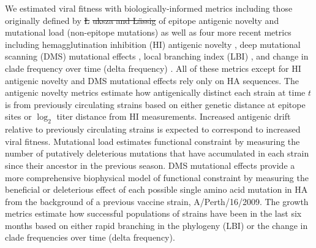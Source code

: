 \documentclass[9pt,lineno]{elife} %
\providecommand{\DIFadd}[1]{{\protect\color{blue}\uwave{#1}}} %
\providecommand{\DIFdel}[1]{{\protect\color{red}\sout{#1}}}                      %
\providecommand{\DIFaddbegin}{} %
\providecommand{\DIFaddend}{} %
\providecommand{\DIFdelbegin}{} %
\providecommand{\DIFdelend}{} %
\providecommand{\DIFaddtex}[1]{{\protect\color{blue}\uwave{#1}}} %
\providecommand{\DIFdeltex}[1]{{\protect\color{red}\sout{#1}}}                      %
\providecommand{\DIFaddbegin}{} %
\providecommand{\DIFaddend}{} %
\providecommand{\DIFdelbegin}{} %
\providecommand{\DIFdelend}{} %
\providecommand{\DIFadd}[1]{\texorpdfstring{\DIFaddtex{#1}}{#1}} %
\providecommand{\DIFdel}[1]{\texorpdfstring{\DIFdeltex{#1}}{}} %
\newcommand{\DIFscaledelfig}{0.5}
\newlength{\DIFdelgraphicswidth} %
\newlength{\DIFdelgraphicsheight} %
\newcommand{\DIFaddincludegraphics}[2][]{{\color{blue}\fbox{\DIFOincludegraphics[#1]{#2}}}} %
\newcommand{\DIFdelincludegraphics}[2][]{%
\sbox{\DIFdelgraphicsbox}{\DIFOincludegraphics[#1]{#2}}%
\settoboxwidth{\DIFdelgraphicswidth}{\DIFdelgraphicsbox} %
\settoboxtotalheight{\DIFdelgraphicsheight}{\DIFdelgraphicsbox} %
\scalebox{\DIFscaledelfig}{%
\parbox[b]{\DIFdelgraphicswidth}{\usebox{\DIFdelgraphicsbox}\\[-\baselineskip] \rule{\DIFdelgraphicswidth}{0em}}\llap{\resizebox{\DIFdelgraphicswidth}{\DIFdelgraphicsheight}{%
\setlength{\unitlength}{\DIFdelgraphicswidth}%
\begin{picture}(1,1)%
\thicklines\linethickness{2pt} %
{\color[rgb]{1,0,0}\put(0,0){\framebox(1,1){}}}%
{\color[rgb]{1,0,0}\put(0,0){\line( 1,1){1}}}%
{\color[rgb]{1,0,0}\put(0,1){\line(1,-1){1}}}%
\end{picture}%
}\hspace*{3pt}}} %
} %
\DeclareRobustCommand{\DIFaddbegin}{\DIFOaddbegin \let\includegraphics\DIFaddincludegraphics} %
\DeclareRobustCommand{\DIFaddend}{\DIFOaddend \let\includegraphics\DIFOincludegraphics} %
\DeclareRobustCommand{\DIFdelbegin}{\DIFOdelbegin \let\includegraphics\DIFdelincludegraphics} %
\DeclareRobustCommand{\DIFdelend}{\DIFOaddend \let\includegraphics\DIFOincludegraphics} %
\begin{document}
\DIFaddend We estimated viral fitness with biologically-informed metrics including those originally defined by \DIFdelbegin %
\DIFdel{\L}%
\DIFdel{uksza and L\"assig }\DIFdelend \cite{Luksza:2014hj} of epitope antigenic novelty and mutational load (non-epitope mutations) as well as four more recent metrics including hemagglutination inhibition (HI) antigenic novelty \DIFdelbegin %
\DIFdelend \DIFaddbegin \citep{Neher:2016hy}\DIFaddend , deep mutational scanning (DMS) mutational effects \DIFdelbegin %
\DIFdelend \DIFaddbegin \citep{Lee2018}\DIFaddend , local branching index (LBI) \DIFdelbegin %
\DIFdelend \DIFaddbegin \citep{Neher:2014eu}\DIFaddend , and change in clade frequency over time (delta frequency) \DIFaddbegin \DIFadd{(Table~\ref{table_model_summary})}\DIFaddend .
All of these metrics except for HI antigenic novelty and DMS mutational effects rely only on HA sequences.
The antigenic novelty metrics estimate how antigenically distinct each strain at time $t$ is from previously circulating strains based on either genetic distance at epitope sites or $\log_{2}$ titer distance from HI measurements.
Increased antigenic drift relative to previously circulating strains is expected to correspond to increased viral fitness.
Mutational load estimates functional constraint by measuring the number of putatively deleterious mutations that have accumulated in each strain since their ancestor in the previous season.
DMS mutational effects provide a more comprehensive biophysical model of functional constraint by measuring the beneficial or deleterious effect of each possible single amino acid mutation in HA from the background of a previous vaccine strain, A/Perth/16/2009.
The growth metrics estimate how successful populations of strains have been in the last six months based on either rapid branching in the phylogeny (LBI) or the change in clade frequencies over time (delta frequency).
\end{document}

